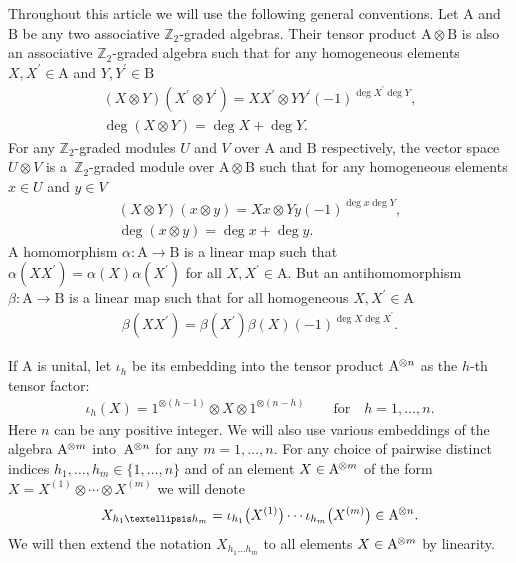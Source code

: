 \documentclass[10pt,a4paper]{amsart}
\numberwithin{equation}{section}
\def\al{\alpha}
\def\be{\beta}
\def\ns{{\hskip-.5pt}}
\def\ot{\otimes}
\def\ZZ{\mathbb{Z}}
\begin{document}
Throughout this article we will use the following general conventions.
Let $\mathrm{A}$ and $\mathrm{B}$ be any two associative
$\ZZ_{2}$-graded algebras. Their tensor product
$\mathrm{A}\ot\mathrm{B}$ is also
an associative $\ZZ_2$-graded algebra such that for any homogeneous
elements
$X,X^\prime\in\mathrm{A}$ and $Y,Y^\prime\in\mathrm{B}$
\begin{gather}\label{conv1}
(X\ot Y) (X^\prime\ot Y^\prime)=X X^\prime\ot Y Y^\prime (-1)^{\deg X^\prime\deg Y},\\
\label{conv2}
\deg (X\ot Y)=\deg X+\deg Y .
\end{gather}
For any $\ZZ_2$-graded modules
$U$ and $V$ over $\mathrm{A}$ and $\mathrm{B}$ respectively,
the vector space $U\ot V$ is a~$\ZZ_2$-graded module over
$\mathrm{A}\ot\mathrm{B}$ such that for any homogeneous elements
$x\in U$ and $y\in V$
\begin{gather}\label{XY}
(X\ot Y) ( x\ot y ) =X x\ot Y y (-1)^{\deg x \deg Y},\\
\label{xy}
\deg ( x\ot y )=\deg x+\deg y .
\end{gather}
A homomorphism $\al\colon \mathrm{A}\to\mathrm{B}$ is a linear map
such that $\al (X X^\prime)=\al (X) \al (X^\prime)$ for all
$X,X^\prime\in\mathrm{A} $. But an antihomomorphism
$\be\colon \mathrm{A}\to\mathrm{B}$ is a linear map
such that for all homogeneous $X,X^\prime\in\mathrm{A}$
\begin{gather}\label{bb}
\be (X X^\prime )=\be (X^\prime) \be (X) (-1)^{\deg X\deg X^\prime}.
\end{gather}

If $\mathrm{A}$ is unital,
let $\iota_{h}$ be
its embedding into the tensor product $\mathrm{A}^{\ns\ot n}$
as the $h $-th tensor factor:
\begin{gather*}
\iota_{h}(X)=1^{\ot (h-1)}\ot X\ot1^{\ot (n-h)}\qquad\text{for}\quad h=1,\dots, n .
\end{gather*}
Here $n$ can be any positive integer.
We will also use various embeddings of the algebra
$\mathrm{A}^{\ns\ot m}$ into~$\mathrm{A}^{\ns\ot n}$
for any $m=1,\dots, n$.
For any choice of pairwise distinct indices $h_1,\dots, h_m\in\{1,\dots, n \}$
and of an element $X\in\mathrm{A}^{\ns\ot m}$ of the form
$X=X^{(1)}\ot\cdots\ot X^{(m)}$ we will denote
\begin{gather*}
X_{h_1\dots h_m}=\iota_{h_1}\big(X^{(1)}\big) \cdots \iota_{h_m}\big(X^{(m)}\big) \in\mathrm{A}^{\ns\ot n}.
\end{gather*}
We will then extend the notation $X_{h_1\dots h_m}$ to all elements
$X\in\mathrm{A}^{\ns\ot m}$ by linearity.
\end{document}
